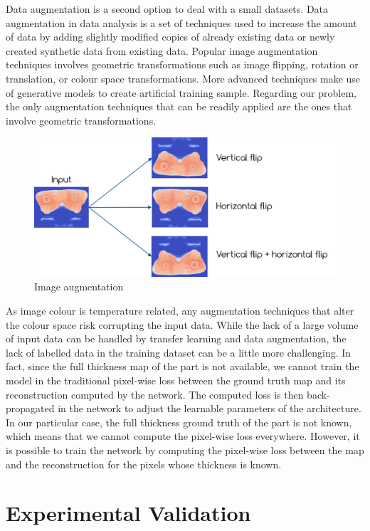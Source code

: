 Data augmentation is a second option to deal with a small datasets. Data augmentation in data analysis is a set of techniques used to increase the amount of data by adding slightly modified copies of already existing data or newly created synthetic data from existing data. Popular image augmentation techniques involves geometric transformations such as image flipping, rotation or translation, or colour space transformations. More advanced techniques make use of generative models to create artificial training sample. Regarding our problem, the only augmentation techniques that can be readily applied are the ones that involve geometric transformations. 
\begin{figure}
\centering
\includegraphics[scale=0.8]{images/chapter_4/data_augmentation.png}
\caption{Image augmentation}
\label{fig:image_augmentation}
\end{figure}

As image colour is temperature related, any augmentation techniques that alter the colour space risk corrupting the input data.
While the lack of a large volume of input data can be handled by transfer learning and data augmentation, the lack of labelled data in the training dataset can be a little more challenging. In fact, since the full thickness map of the part is not available, we cannot train the model in the traditional pixel-wise loss between the ground truth map and its reconstruction computed by the network. The computed loss is then back-propagated in the network to adjust the learnable parameters of the architecture. In our particular case, the full thickness ground truth of the part is not known, which means that we cannot compute the pixel-wise loss everywhere. However, it is possible to train the network by computing the pixel-wise loss between the map and the reconstruction for the pixels whose thickness is known.

\section{Experimental Validation} \label{Experimental Validation}

